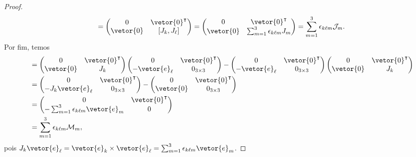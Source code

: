 \begin{proof}
\begin{equation*}
        [\mathcal{J}_k,\mathcal{J}_\ell] = \begin{pmatrix}
            0 & \vetor{0}^\intercal\\
            \vetor{0} & [J_k,J_\ell]
        \end{pmatrix}
        = \begin{pmatrix}
            0 & \vetor{0}^\intercal\\
            \vetor{0} & \sum_{m = 1}^3 \epsilon_{k \ell m} J_m
        \end{pmatrix} =
        \sum_{m = 1}^3 \epsilon_{k \ell m} \mathcal{J}_m.
    \end{equation*}
    Por fim, temos
    \begin{align*}
        [\mathcal{J}_k,\mathcal{M}_\ell] &=
        \begin{pmatrix}
            0 & \vetor{0}^\intercal\\
            \vetor{0} & J_k
        \end{pmatrix}
        \begin{pmatrix}
            0 & \vetor{0}^\intercal\\
            -\vetor{e}_\ell & 0_{3\times3}
        \end{pmatrix}-
        \begin{pmatrix}
            0 & \vetor{0}^\intercal\\
            -\vetor{e}_\ell & 0_{3\times3}
        \end{pmatrix}
        \begin{pmatrix}
            0 & \vetor{0}^\intercal\\
            \vetor{0} & J_k
        \end{pmatrix}\\
        &=
        \begin{pmatrix}
            0 & \vetor{0}^\intercal\\
            -J_k\vetor{e}_\ell & 0_{3\times 3}
        \end{pmatrix}-
        \begin{pmatrix}
            0 & \vetor{0}^\intercal\\
            \vetor{0} & 0_{3\times3}
        \end{pmatrix}\\
        &=
        \begin{pmatrix}
            0 & \vetor{0}^\intercal\\
            -\sum_{m=1}^3 \epsilon_{k\ell m}\vetor{e}_m & 0
        \end{pmatrix}\\
        &=
        \sum_{m=1}^3 \epsilon_{k \ell m} \mathcal{M}_m,
    \end{align*}
    pois \(J_k \vetor{e}_\ell = \vetor{e}_k \times \vetor{e}_\ell = \sum_{m=1}^3 \epsilon_{k \ell m}\vetor{e}_m\).
\end{proof}
